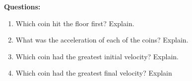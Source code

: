 \vspace{40pt}

{\noindent \bf Questions:}

\begin{enumerate}
\item Which coin hit the floor first? Explain. \vspace{10mm}

\item What was the acceleration of each of the coins? Explain. \vspace{10mm}

\item Which coin had the greatest initial velocity? Explain. \vspace{10mm}

\item Which coin had the greatest final velocity? Explain
\end{enumerate}
